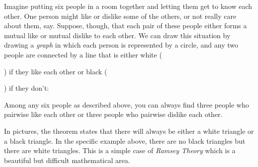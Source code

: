 Imagine putting six people in a room together and letting them get to know each other.
One person might like or dislike some of the others,
or not really care about them, say.
Suppose, though, that each pair of these people either forms a mutual like or
mutual dislike to each other.
We can draw this situation by drawing a {\em graph} in which
each person is represented by a circle,
and any two people are connected by a line
that is either white ()
if they like each other
or black () if they don't:

\begin{center}
\end{center}

\begin{theorem}
\label{thm:R33}
Among any six people as described above,
you can always find three people who pairwise like each other
or three people who pairwise dislike each other.
\end{theorem}

In pictures, the theorem states that
there will always be either a white triangle or a black triangle.
In the specific example above,
there are no black triangles but there are  white triangles.
This is a simple case of {\em Ramsey Theory} which is a beautiful but difficult mathematical area.

